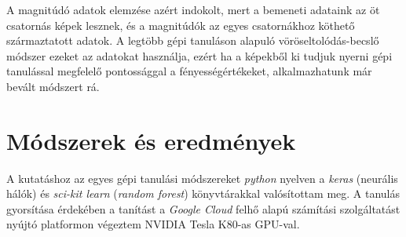 \documentclass[12pt,letterpaper,twoside,openright]{book}
\begin{document}
 \newline\indent
 A magnitúdó adatok elemzése azért indokolt, mert a bemeneti adataink az öt csatornás képek lesznek, és a magnitúdók az egyes csatornákhoz köthető származtatott adatok. A legtöbb gépi tanuláson alapuló vöröseltolódás-becslő módszer ezeket az adatokat használja, ezért ha a képekből ki tudjuk nyerni gépi tanulással megfelelő pontossággal a fényességértékeket, alkalmazhatunk már bevált módszert rá.
 
 
 \chapter{Módszerek és eredmények}
 A kutatáshoz az egyes gépi tanulási módszereket \textit{python} nyelven a \textit{keras} (neurális hálók) és \textit{sci-kit learn} (\textit{random forest}) könyvtárakkal valósítottam meg. A tanulás gyorsítása érdekében a tanítást a \textit{Google Cloud} felhő alapú számítási szolgáltatást nyújtó platformon végeztem NVIDIA Tesla K80-as GPU-val.
 
 
\end{document}
